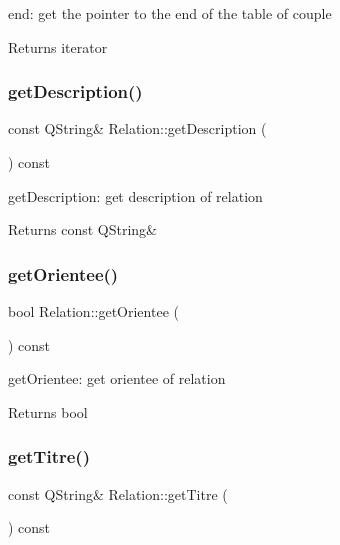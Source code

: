 end\+: get the pointer to the end of the table of couple 

\begin{DoxyReturn}{Returns}
iterator 
\end{DoxyReturn}
\mbox{\label{class_relation_a078c6c43b163152aa40a9ac535175b9e}} 
\subsubsection{\texorpdfstring{get\+Description()}{getDescription()}}
{\footnotesize\ttfamily const Q\+String\& Relation\+::get\+Description (\begin{DoxyParamCaption}{ }\end{DoxyParamCaption}) const\hspace{0.3cm}{\ttfamily [inline]}}



get\+Description\+: get description of relation 

\begin{DoxyReturn}{Returns}
const Q\+String\& 
\end{DoxyReturn}
\mbox{\label{class_relation_a4a985197f794d8f2d0c9a6d21c2eae13}} 
\subsubsection{\texorpdfstring{get\+Orientee()}{getOrientee()}}
{\footnotesize\ttfamily bool Relation\+::get\+Orientee (\begin{DoxyParamCaption}{ }\end{DoxyParamCaption}) const\hspace{0.3cm}{\ttfamily [inline]}}



get\+Orientee\+: get orientee of relation 

\begin{DoxyReturn}{Returns}
bool 
\end{DoxyReturn}
\mbox{\label{class_relation_a411be3a1dfc417342db768555a2afe41}} 
\subsubsection{\texorpdfstring{get\+Titre()}{getTitre()}}
{\footnotesize\ttfamily const Q\+String\& Relation\+::get\+Titre (\begin{DoxyParamCaption}{ }\end{DoxyParamCaption}) const\hspace{0.3cm}{\ttfamily [inline]}}



